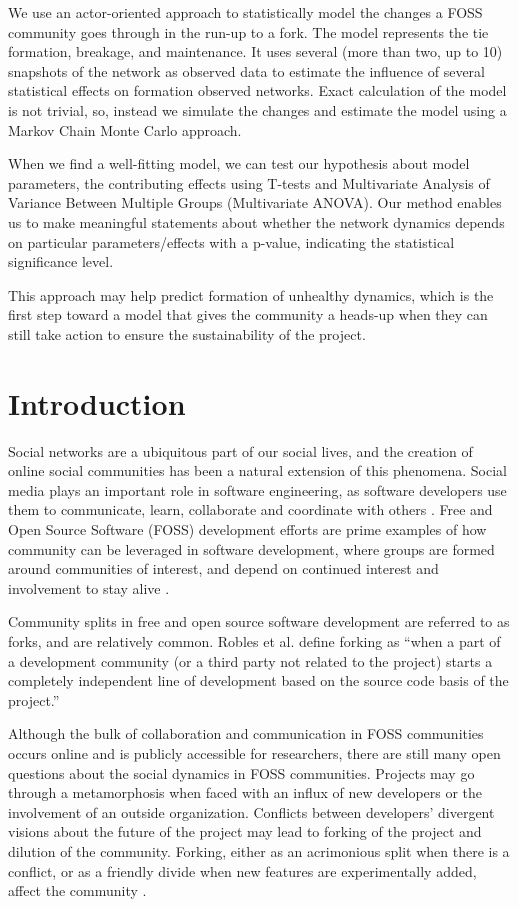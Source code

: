 \documentclass[11pt]{report}
\begin{document}
We use an actor-oriented approach to statistically model the changes a FOSS community goes through in the run-up to a fork. The model represents the tie formation, breakage, and maintenance. It uses several (more than two, up to 10) snapshots of the network as observed data to estimate the influence of several statistical effects on formation observed networks. Exact calculation of the model is not trivial, so, instead we simulate the changes and estimate the model using a Markov Chain Monte Carlo approach. 

When we find a well-fitting model, we can test our hypothesis about model parameters, the contributing effects using T-tests and Multivariate Analysis of Variance Between Multiple Groups (Multivariate ANOVA). Our method enables us to make meaningful statements about whether the network dynamics depends on  particular parameters/effects with a p-value, indicating the statistical significance level. 

This approach may help predict formation of unhealthy dynamics, which is the first step toward a model that gives the community a heads-up when they can still take action to ensure the sustainability of the project.

\pagebreak

\section{Introduction}
\label{introduction}
Social networks are a ubiquitous part of our social lives, and the creation of online social communities has been a natural extension of this phenomena. Social media plays an important role in software engineering, as software developers use them to communicate, learn, collaborate and coordinate with others \cite{Storey}. Free and Open Source Software (FOSS) development efforts are prime examples of how community can be leveraged in software development, where groups are formed around communities of interest, and depend on continued interest and involvement to stay alive \cite{NymanCodeForking}.

Community splits in free and open source software development are referred to as forks, and are relatively common. Robles et al. \cite{Robles} define forking as ``when a part of a development community (or a third party not related to the project) starts a completely independent line of development based on the source code basis of the project.'' 

Although the bulk of collaboration and communication in FOSS communities occurs online and is publicly accessible for researchers, there are still many open questions about the social dynamics in FOSS communities. Projects may go through a metamorphosis when faced with an influx of new developers or the involvement of an outside organization. Conflicts between developers' divergent visions about the future of the project may lead to forking of the project and dilution of the community. Forking, either as an acrimonious split when there is a conflict, or as a friendly divide when new features are experimentally added, affect the community \cite{Bezrukova}.
\end{document}
